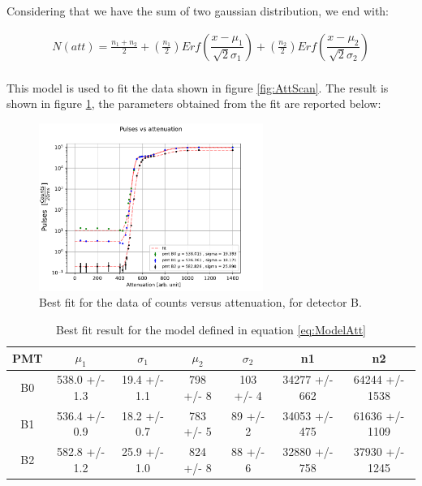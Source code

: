 Considering that we have the sum of two gaussian distribution, we end with:

\begin{equation} \label{eq:ModelAtt}
\begin{split}
N(att) = \frac{n_{1} + n_{2}}{2} + (\frac{n_{1}}{2}) Erf(\dfrac{x - \mu_{1}}{\sqrt{2} \sigma_{1} })   + (\frac{n_{2}}{2}) Erf(\dfrac{x - \mu_{2}}{\sqrt{2} \sigma_{2}}) \\
\end{split}
\end{equation}

This model is used to fit the data shown in figure \ref{fig:AttScan}. The result is shown in figure \ref{fig:BestFitAtt}, the parameters obtained from the fit are reported below:

\begin{figure}[!ht]
\centering
\includegraphics[width = 0.65\textwidth ]{Analysis/CalibrationPMT/Fit_attenuation.pdf}
\caption{Best fit for the data of counts versus attenuation, for detector B.}
\label{fig:BestFitAtt}
\end{figure}

\begin{table}[!ht]
\centering
\begin{tabular}{c|c|c|c|c|c|c}
\hline
 PMT   &  $\mu_{1}$         &  $\sigma_{1}$         & $\mu_{2}$          & $\sigma_{2}$   & n1                & n2                 \\
\hline
 B0    & 538.0 +/- 1.3 & 19.4 +/- 1.1 & 798 +/- 8 & 103 +/- 4 & 34277 +/- 662 & 64244 +/- 1538 \\
 B1    & 536.4 +/- 0.9 & 18.2 +/- 0.7 & 783 +/- 5 & 89 +/- 2  & 34053 +/- 475 & 61636 +/- 1109 \\
 B2    & 582.8 +/- 1.2 & 25.9 +/- 1.0 & 824 +/- 8 & 88 +/- 6  & 32880 +/- 758 & 37930 +/- 1245 \\
\hline
\end{tabular}
\caption{Best fit result for the model defined in equation \ref{eq:ModelAtt}}
\end{table}

